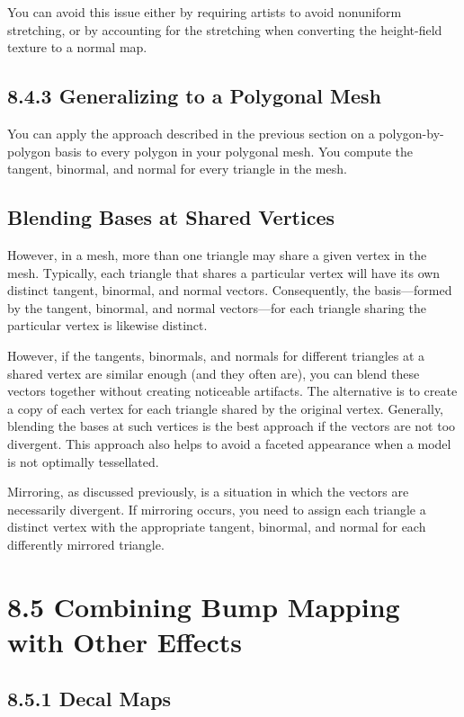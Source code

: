 \documentclass[../main.tex]{subfiles}
\begin{document}
You can avoid this issue either by requiring artists to avoid nonuniform stretching, or by accounting for the stretching when converting the height-field texture to a normal map.

\subsection{8.4.3 Generalizing to a Polygonal Mesh}

You can apply the approach described in the previous section on a polygon-by-polygon basis to every polygon in your polygonal mesh. You compute the tangent, binormal, and normal for every triangle in the mesh.

\subsection*{Blending Bases at Shared Vertices}

However, in a mesh, more than one triangle may share a given vertex in the mesh. Typically, each triangle that shares a particular vertex will have its own distinct tangent, binormal, and normal vectors. Consequently, the basis—formed by the tangent, binormal, and normal vectors—for each triangle sharing the particular vertex is likewise distinct.

However, if the tangents, binormals, and normals for different triangles at a shared vertex are similar enough (and they often are), you can blend these vectors together without creating noticeable artifacts. The alternative is to create a copy of each vertex for each triangle shared by the original vertex. Generally, blending the bases at such vertices is the best approach if the vectors are not too divergent. This approach also helps to avoid a faceted appearance when a model is not optimally tessellated.

Mirroring, as discussed previously, is a situation in which the vectors are necessarily divergent. If mirroring occurs, you need to assign each triangle a distinct vertex with the appropriate tangent, binormal, and normal for each differently mirrored triangle.

\section{8.5 Combining Bump Mapping with Other Effects}

\subsection{8.5.1 Decal Maps}
\end{document}
